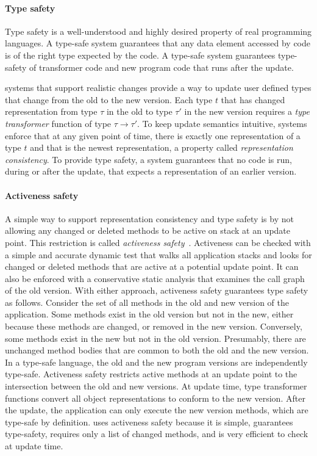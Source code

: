 \paragraph{Type safety}

Type safety is a well-understood and highly desired property of real
programming languages. A type-safe system guarantees that any data element
accessed by code is of the right type expected by the code. A type-safe
\USD system guarantees type-safety of transformer code and new program
code that runs after the update.

\USD systems that support realistic changes provide a way to update user
defined types that change from the old to the new version. Each type $t$
that has changed representation from type $\tau$ in the old to type $\tau'$ in the
new version requires a {\em type transformer} function of type $\tau
\rightarrow \tau'$. To keep update semantics intuitive, \USD systems
enforce that at any given point of time, there is exactly one
representation of a type $t$ and that is the newest representation, a
property called {\em representation consistency}. To provide type safety, a \USD system guarantees that
no code is run, during or after the update, that expects a representation
of an earlier version.

\paragraph{Activeness safety}
A simple way to support representation consistency
and type safety is by not allowing any changed or deleted methods to be
active on stack at an update point.  This restriction is called {\em
activeness safety}~\cite{walton-thesis, ksplice, altekar05opus,
baumann07reboots}.
Activeness can be
checked with a simple and accurate dynamic test that walks all application
stacks and looks for changed or deleted methods that are active at a
potential update point. It can also be enforced with a conservative static
analysis that examines the call graph of the old version. With either
approach, activeness safety guarantees type safety as follows. Consider the
set of all methods in the old and new version of the application. Some
methods exist in the old version but not in the new, either because these
methods are changed, or removed in the new version.
Conversely, some methods exist in the new but not in the old version.
Presumably, there are unchanged method bodies that are common to both the
old and the new version. In a type-safe language, the old and the new
program versions are independently type-safe. Activeness safety restricts
active methods at an update point to the intersection between the old and new
versions. At update time, type transformer functions convert all object
representations to conform to the new version. After the update, the
application can only execute the new version methods, which are type-safe by
definition.
\JV uses activeness safety because it is simple, guarantees type-safety,
requires only a list of changed methods, and is very efficient to check at
update time.


